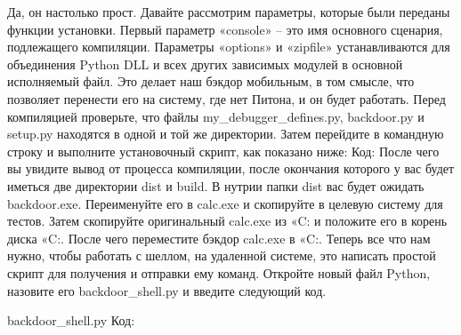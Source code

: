 \documentclass[12pt, a4paper, oneside]{book}
\begin{document}
Да, он настолько прост. Давайте рассмотрим параметры, которые были переданы функции установки. Первый параметр «console» – это имя основного сценария, подлежащего компиляции. Параметры «options» и «zipfile» устанавливаются для объединения Python DLL и всех других зависимых модулей в основной исполняемый файл. Это делает наш бэкдор мобильным, в том смысле, что позволяет перенести его на систему, где нет Питона, и он будет работать. Перед компиляцией проверьте, что файлы my\_debugger\_defines.py, backdoor.py и setup.py находятся в одной и той же директории. Затем перейдите в командную строку и выполните установочный скрипт, как показано ниже:
Код:
После чего вы увидите вывод от процесса компиляции, после окончания которого у вас будет иметься две директории dist и build. В нутрии папки dist вас будет ожидать backdoor.exe. Переименуйте его в calc.exe и скопируйте в целевую систему для тестов. Затем скопируйте оригинальный calc.exe из «C:\WINDOWS{}\» и положите его в корень диска «C:\». После чего переместите бэкдор calc.exe в «C:\WINDOWS{}\». Теперь все что нам нужно, чтобы работать с шеллом, на удаленной системе, это написать простой скрипт для получения и отправки ему команд. Откройте новый файл Python, назовите его backdoor\_shell.py и введите следующий код.

backdoor\_shell.py
Код:









\end{document}
